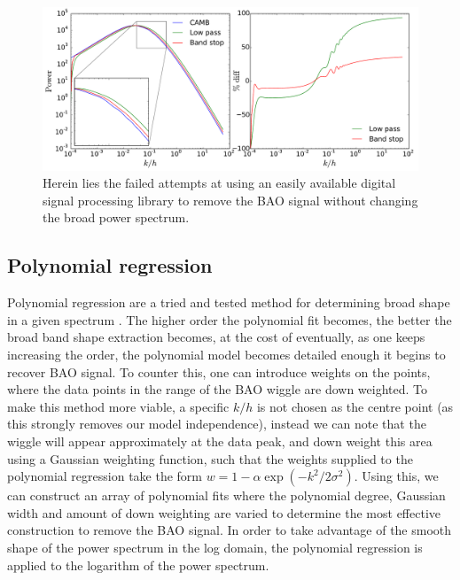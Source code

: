 \documentclass[titlesmallcaps, examinerscopy, copyrightpage]{uqthesis}
\begin{document}
\begin{appendices}
\begin{figure}[h]
  \begin{center}
    \includegraphics[width=\textwidth]{images/Alowpass.pdf}
  	\caption{Herein lies the failed attempts at using an easily available digital signal processing library to remove the BAO signal without changing the broad power spectrum.}
  	\label{fig:Alowpass}
  \end{center}
\end{figure}

\subsection{Polynomial regression}

Polynomial regression are a tried and tested method for determining broad shape in a given spectrum \citep{baldry2014galaxy}. The higher order the polynomial fit becomes, the better the broad band shape extraction becomes, at the cost of eventually, as one keeps increasing the order, the polynomial model becomes detailed enough it begins to recover BAO signal. To counter this, one can introduce weights on the points, where the data points in the range of the BAO wiggle are down weighted. To make this method more viable, a specific $k/h$ is not chosen as the centre point (as this strongly removes our model independence), instead we can note that the wiggle will appear approximately at the data peak, and down weight this area using a Gaussian weighting function, such that the weights supplied to the polynomial regression take the form $w = 1 - \alpha \exp\left(-k^2/2 \sigma^2\right)$. Using this, we can construct an array of polynomial fits where the polynomial degree, Gaussian width and amount of down weighting are varied to determine the most effective construction to remove the BAO signal. In order to take advantage of the smooth shape of the power spectrum in the log domain, the polynomial regression is applied to the logarithm of the power spectrum.



\end{appendices}
\end{document}

